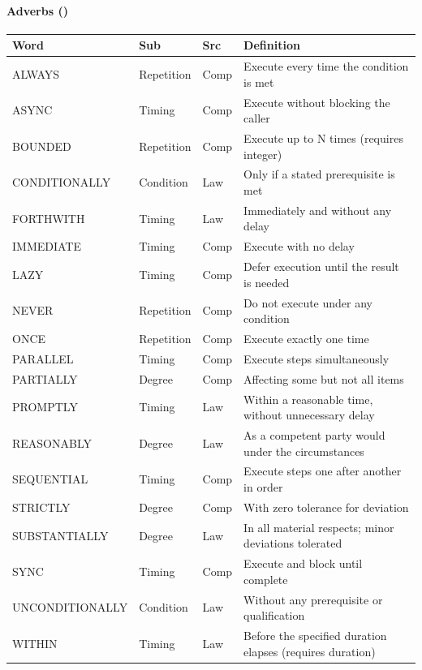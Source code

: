 \documentclass{article}
\begin{document}
\paragraph{Adverbs (\VocabAdverbs)}
\small
\begin{tabular}{lllp{7cm}}
\toprule \textbf{Word} & \textbf{Sub} & \textbf{Src} & \textbf{Definition} \\ \midrule
ALWAYS & Repetition & Comp & Execute every time the condition is met \\
ASYNC & Timing & Comp & Execute without blocking the caller \\
BOUNDED & Repetition & Comp & Execute up to N times (requires integer) \\
CONDITIONALLY & Condition & Law & Only if a stated prerequisite is met \\
FORTHWITH & Timing & Law & Immediately and without any delay \\
IMMEDIATE & Timing & Comp & Execute with no delay \\
LAZY & Timing & Comp & Defer execution until the result is needed \\
NEVER & Repetition & Comp & Do not execute under any condition \\
ONCE & Repetition & Comp & Execute exactly one time \\
PARALLEL & Timing & Comp & Execute steps simultaneously \\
PARTIALLY & Degree & Comp & Affecting some but not all items \\
PROMPTLY & Timing & Law & Within a reasonable time, without unnecessary delay \\
REASONABLY & Degree & Law & As a competent party would under the circumstances \\
SEQUENTIAL & Timing & Comp & Execute steps one after another in order \\
STRICTLY & Degree & Comp & With zero tolerance for deviation \\
SUBSTANTIALLY & Degree & Law & In all material respects; minor deviations tolerated \\
SYNC & Timing & Comp & Execute and block until complete \\
UNCONDITIONALLY & Condition & Law & Without any prerequisite or qualification \\
WITHIN & Timing & Law & Before the specified duration elapses (requires duration) \\
\bottomrule
\end{tabular}
\normalsize
\end{document}
